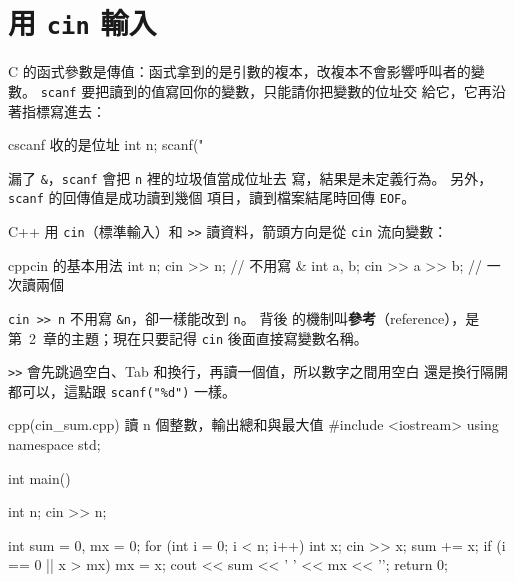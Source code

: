 \section{用 \texttt{cin} 輸入}
\label{sec:cin}

\begin{crecap}
C 的函式參數是傳值：函式拿到的是引數的複本，改複本不會影響呼叫者的變
數。 \texttt{scanf} 要把讀到的值寫回你的變數，只能請你把變數的位址交
給它，它再沿著指標寫進去：

\begin{code}{c}{scanf 收的是位址}
int n;
scanf("%
\end{code}

漏了 \texttt{\&}，\texttt{scanf} 會把 \texttt{n} 裡的垃圾值當成位址去
寫，結果是未定義行為。 另外，\texttt{scanf} 的回傳值是成功讀到幾個
項目，讀到檔案結尾時回傳 \texttt{EOF}。
\end{crecap}

C++ 用 \texttt{cin}（標準輸入）和 \texttt{>>} 讀資料，箭頭方向是從
\texttt{cin} 流向變數：

\begin{code}{cpp}{cin 的基本用法}
int n;
cin >> n;          // 不用寫 &
int a, b;
cin >> a >> b;     // 一次讀兩個
\end{code}

\texttt{cin >> n} 不用寫 \texttt{\&n}，卻一樣能改到 \texttt{n}。 背後
的機制叫\textbf{參考}（reference），是第~2~章的主題；現在只要記得
\texttt{cin} 後面直接寫變數名稱。

\texttt{>>} 會先跳過空白、Tab 和換行，再讀一個值，所以數字之間用空白
還是換行隔開都可以，這點跟 \texttt{scanf("\%d")} 一樣。

\begin{example}[label=ex:cin-sum]{cpp}{(cin\_sum.cpp) 讀 n 個整數，輸出總和與最大值}
#include <iostream>
using namespace std;

int main() {
    int n;
    cin >> n;

    int sum = 0, mx = 0;
    for (int i = 0; i < n; i++) {
        int x;
        cin >> x;
        sum += x;
        if (i == 0 || x > mx) {
            mx = x;
        }
    }
    cout << sum << ' ' << mx << '\n';
    return 0;
}
\end{example}


